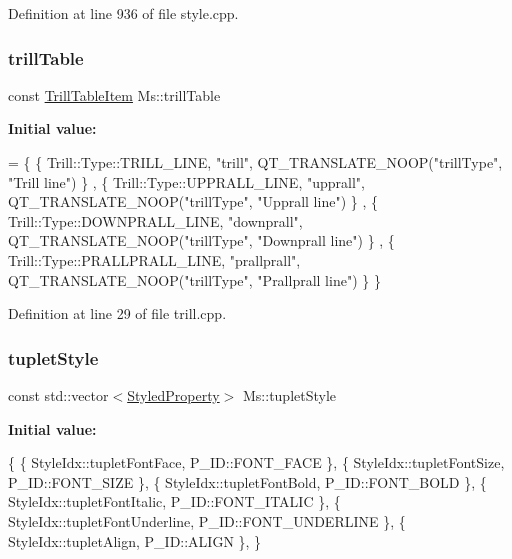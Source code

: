 Definition at line 936 of file style.\+cpp.

\mbox{\label{namespace_ms_a8d83da38d55b342483d4052c7fac0184}} 
\subsubsection{\texorpdfstring{trill\+Table}{trillTable}}
{\footnotesize\ttfamily const \hyperlink{struct_ms_1_1_trill_table_item}{Trill\+Table\+Item} Ms\+::trill\+Table}

{\bfseries Initial value\+:}
\begin{DoxyCode}
= \{
      \{ Trill::Type::TRILL\_LINE,      \textcolor{stringliteral}{"trill"},      QT\_TRANSLATE\_NOOP(\textcolor{stringliteral}{"trillType"}, \textcolor{stringliteral}{"Trill line"})          \}
      ,
      \{ Trill::Type::UPPRALL\_LINE,    \textcolor{stringliteral}{"upprall"},    QT\_TRANSLATE\_NOOP(\textcolor{stringliteral}{"trillType"}, \textcolor{stringliteral}{"Upprall line"})        \}
      ,
      \{ Trill::Type::DOWNPRALL\_LINE,  \textcolor{stringliteral}{"downprall"},  QT\_TRANSLATE\_NOOP(\textcolor{stringliteral}{"trillType"}, \textcolor{stringliteral}{"Downprall line"})      \}
      ,
      \{ Trill::Type::PRALLPRALL\_LINE, \textcolor{stringliteral}{"prallprall"}, QT\_TRANSLATE\_NOOP(\textcolor{stringliteral}{"trillType"}, \textcolor{stringliteral}{"Prallprall line"})     \}
      \}
\end{DoxyCode}


Definition at line 29 of file trill.\+cpp.

\mbox{\label{namespace_ms_a8a2ddfa7eb8f4c085e2d57b02887261b}} 
\subsubsection{\texorpdfstring{tuplet\+Style}{tupletStyle}}
{\footnotesize\ttfamily const std\+::vector$<$\hyperlink{struct_ms_1_1_styled_property}{Styled\+Property}$>$ Ms\+::tuplet\+Style}

{\bfseries Initial value\+:}
\begin{DoxyCode}
\{
      \{ StyleIdx::tupletFontFace,                     P\_ID::FONT\_FACE              \},
      \{ StyleIdx::tupletFontSize,                     P\_ID::FONT\_SIZE              \},
      \{ StyleIdx::tupletFontBold,                     P\_ID::FONT\_BOLD              \},
      \{ StyleIdx::tupletFontItalic,                   P\_ID::FONT\_ITALIC            \},
      \{ StyleIdx::tupletFontUnderline,                P\_ID::FONT\_UNDERLINE         \},
      \{ StyleIdx::tupletAlign,                        P\_ID::ALIGN                  \},
      \}
\end{DoxyCode}


